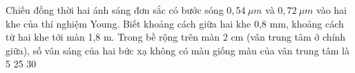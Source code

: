 \begin{vidu}%
Chiếu đồng thời hai ánh sáng đơn sắc có bước sóng $0,54\ \mu m$ và $0,72\ \mu m$ vào hai khe của thí nghiệm Young. Biết khoảng cách giữa hai khe 0,8 mm, khoảng cách từ hai khe tới màn 1,8 m. Trong bề rộng trên màn 2  cm (vân trung tâm ở chính giữa), số vân sáng của hai bức xạ không có màu giống màu của vân trung tâm là
\choice
{}
{5}
{25}
{30}
\end{vidu} %
 
